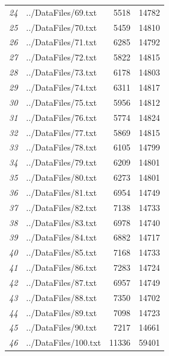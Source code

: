 \documentclass[12pt]{article}
\begin{document}
\begin{table}[ht]
{\begin{tabular}{rlrr}
								{\textit{24}} & ../DataFiles/69.txt & 5518 & 14782 \\ 
								{\textit{25}} & ../DataFiles/70.txt & 5459 & 14810 \\ 
								{\textit{26}} & ../DataFiles/71.txt & 6285 & 14792 \\ 
								{\textit{27}} & ../DataFiles/72.txt & 5822 & 14815 \\ 
								{\textit{28}} & ../DataFiles/73.txt & 6178 & 14803 \\ 
								{\textit{29}} & ../DataFiles/74.txt & 6311 & 14817 \\ 
								{\textit{30}} & ../DataFiles/75.txt & 5956 & 14812 \\ 
								{\textit{31}} & ../DataFiles/76.txt & 5774 & 14824 \\ 
								{\textit{32}} & ../DataFiles/77.txt & 5869 & 14815 \\ 
								{\textit{33}} & ../DataFiles/78.txt & 6105 & 14799 \\ 
								{\textit{34}} & ../DataFiles/79.txt & 6209 & 14801 \\ 
								{\textit{35}} & ../DataFiles/80.txt & 6273 & 14801 \\ 
								{\textit{36}} & ../DataFiles/81.txt & 6954 & 14749 \\ 
								{\textit{37}} & ../DataFiles/82.txt & 7138 & 14733 \\ 
								{\textit{38}} & ../DataFiles/83.txt & 6978 & 14740 \\ 
								{\textit{39}} & ../DataFiles/84.txt & 6882 & 14717 \\ 
								{\textit{40}} & ../DataFiles/85.txt & 7168 & 14733 \\ 
								{\textit{41}} & ../DataFiles/86.txt & 7283 & 14724 \\ 
								{\textit{42}} & ../DataFiles/87.txt & 6957 & 14749 \\ 
								{\textit{43}} & ../DataFiles/88.txt & 7350 & 14702 \\ 
								{\textit{44}} & ../DataFiles/89.txt & 7098 & 14723 \\ 
								{\textit{45}} & ../DataFiles/90.txt & 7217 & 14661 \\ 
								{\textit{46}} & ../DataFiles/100.txt & 11336 & 59401 \\ 
								\hline
							\end{tabular}
						}
				\end{table}
				\clearpage
\end{document}
